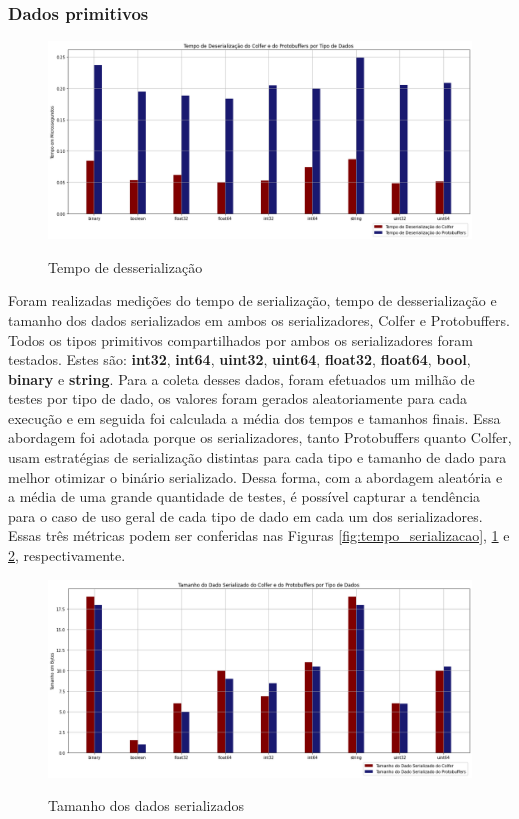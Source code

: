 \subsubsection{Dados primitivos}

\begin{figure}[ht]
    \centering
    \caption{Tempo de desserialização}
    \includegraphics[width=\textwidth]{figuras/graficos/serializacao/tempo_deserializacao.png} 
    \label{fig:tempo_desserializacao}
\end{figure}

Foram realizadas medições do tempo de serialização, tempo de desserialização e tamanho dos dados serializados em ambos os serializadores, Colfer e Protobuffers. Todos os tipos primitivos compartilhados por ambos os serializadores foram testados. Estes são: \textbf{int32}, \textbf{int64}, \textbf{uint32}, \textbf{uint64}, \textbf{float32}, \textbf{float64}, \textbf{bool}, \textbf{binary} e \textbf{string}. Para a coleta desses dados, foram efetuados um milhão de testes por tipo de dado, os valores foram gerados aleatoriamente para cada execução e em seguida foi calculada a média dos tempos e tamanhos finais. Essa abordagem foi adotada porque os serializadores, tanto Protobuffers quanto Colfer, usam estratégias de serialização distintas para cada tipo e tamanho de dado para melhor otimizar o binário serializado. Dessa forma, com a abordagem aleatória e a média de uma grande quantidade de testes, é possível capturar a tendência para o caso de uso geral de cada tipo de dado em cada um dos serializadores. Essas três métricas podem ser conferidas nas Figuras \ref{fig:tempo_serializacao}, \ref{fig:tempo_desserializacao} e \ref{fig:tamanho_serializado}, respectivamente.

\begin{figure}[ht]
    \centering
    \caption{Tamanho dos dados serializados}
    \includegraphics[width=\textwidth]{figuras/graficos/serializacao/tamanho_serializado.png} 
    \label{fig:tamanho_serializado}
\end{figure}

